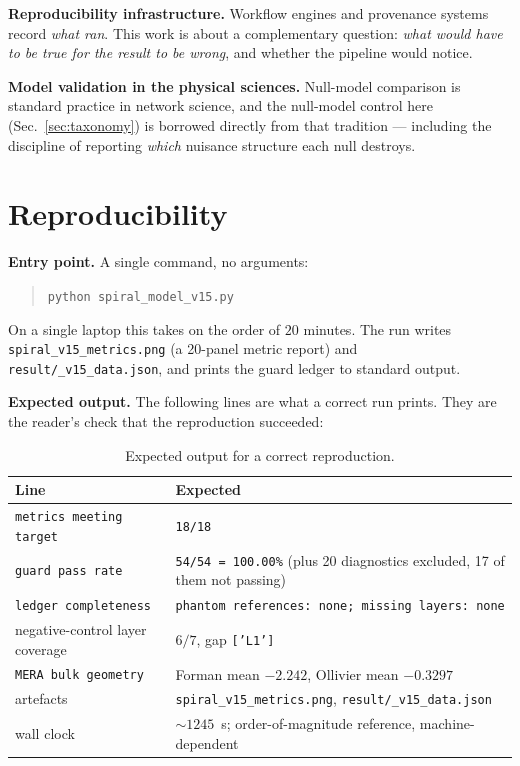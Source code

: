 \documentclass[11pt,a4paper]{article}
\newcommand{\code}[1]{\texttt{\small #1}}
\begin{document}
\textbf{Reproducibility infrastructure.} Workflow engines and provenance systems
record \emph{what ran}. This work is about a complementary question: \emph{what
would have to be true for the result to be wrong}, and whether the pipeline would
notice.

\textbf{Model validation in the physical sciences.} Null-model comparison is
standard practice in network science, and the null-model control here
(Sec.~\ref{sec:taxonomy}) is borrowed directly from that tradition --- including the
discipline of reporting \emph{which} nuisance structure each null destroys.

\section{Reproducibility}
\label{sec:repro}

\textbf{Entry point.} A single command, no arguments:

\begin{quote}
\code{python spiral\_model\_v15.py}
\end{quote}

\noindent On a single laptop this takes on the order of $20$ minutes. The run writes
\code{spiral\_v15\_metrics.png} (a 20-panel metric report) and
\code{result/\_v15\_data.json}, and prints the guard ledger to standard output.

\textbf{Expected output.} The following lines are what a correct run prints. They
are the reader's check that the reproduction succeeded:

\begin{table}[h]
\centering\small
\begin{tabular}{@{}p{8.4cm}p{6.6cm}@{}}
\toprule
\textbf{Line} & \textbf{Expected} \\
\midrule
\code{metrics meeting target} & \code{18/18} \\
\code{guard pass rate} & \code{54/54 = 100.00\%} (plus 20 diagnostics excluded,
                         17 of them not passing) \\
\code{ledger completeness} & \code{phantom references: none; missing layers: none} \\
negative-control layer coverage & $6/7$, gap \code{['L1']} \\
\code{MERA bulk geometry} & Forman mean $-2.242$, Ollivier mean $-0.3297$ \\
artefacts & \code{spiral\_v15\_metrics.png}, \code{result/\_v15\_data.json} \\
wall clock & $\sim 1245$~s; order-of-magnitude reference, machine-dependent \\
\bottomrule
\end{tabular}
\caption{Expected output for a correct reproduction.}
\label{tab:expected}
\end{table}
\end{document}
